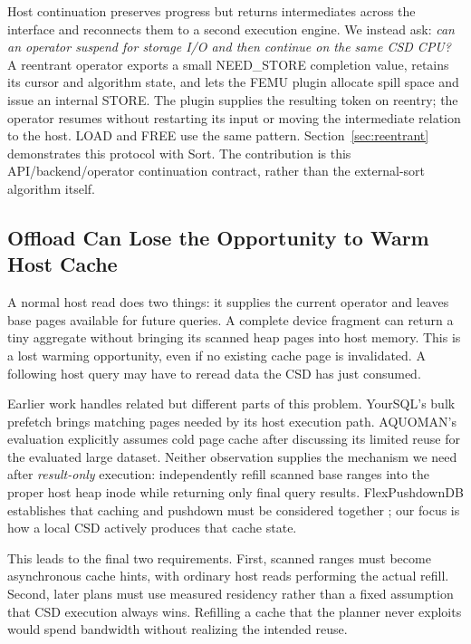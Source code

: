\documentclass[sigconf, nonacm]{acmart}
\begin{document}
Host continuation preserves progress but returns intermediates across the
interface and reconnects them to a second execution engine. We instead ask:
\emph{can an operator suspend for storage I/O and then continue on the same
CSD CPU?} A reentrant operator exports a small NEED\_STORE completion value,
retains its cursor and algorithm state, and lets the FEMU plugin allocate
spill space and issue an internal STORE. The plugin supplies the resulting
token on reentry; the operator resumes without restarting its input or
moving the intermediate relation to the host. LOAD and FREE use the same
pattern. Section~\ref{sec:reentrant} demonstrates this protocol with Sort.
The contribution is this API/backend/operator continuation contract, rather
than the external-sort algorithm itself.

\subsection{Offload Can Lose the Opportunity to Warm Host Cache}
A normal host read does two things: it supplies the current operator and
leaves base pages available for future queries. A complete device fragment
can return a tiny aggregate without bringing its scanned heap pages into
host memory. This is a lost warming opportunity, even if no existing cache
page is invalidated. A following host query may have to reread data the CSD
has just consumed.

Earlier work handles related but different parts of this problem. YourSQL's
bulk prefetch brings matching pages needed by its host execution path.
AQUOMAN's evaluation explicitly assumes cold page cache after discussing its
limited reuse for the evaluated large dataset. Neither observation supplies
the mechanism we need after \emph{result-only} execution: independently
refill scanned base ranges into the proper host heap inode while returning
only final query results. FlexPushdownDB establishes that caching and
pushdown must be considered together \cite{fpdb}; our focus is how a local
CSD actively produces that cache state.

This leads to the final two requirements. First, scanned ranges must become
asynchronous cache hints, with ordinary host reads performing the actual
refill. Second, later plans must use measured residency rather than a fixed
assumption that CSD execution always wins. Refilling a cache that the planner
never exploits would spend bandwidth without realizing the intended reuse.
\end{document}
